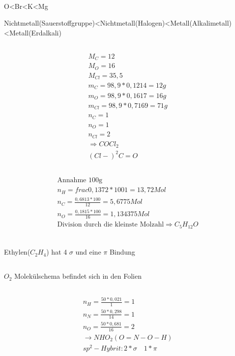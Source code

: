 \documentclass[a4paper]{article}
\begin{document}
\subsection{}
  O<Br<K<Mg

  Nichtmetall(Sauerstoffgruppe)<Nichtmetall(Halogen)<Metall(Alkalimetall)<Metall(Erdalkali)

\subsection{}
\begin{align}
  M_C=12 \\
  M_O=16\\
  M_{Cl}=35,5 \\
  m_C=98,9*0,1214=12g\\
  m_O=98,9*0,1617=16g\\
  m_{Cl}=98,9*0,7169=71g\\
  n_C=1\\
  n_O=1\\
  n_{Cl}=2\\
  \Rightarrow COCl_2\\
  (Cl-)^2C=O
\end{align}

\subsection{}
\begin{align}
  \text{Annahme 100g}\\
  n_H=frac{0,1372*100}{1}=13,72Mol\\
  n_C=\frac{0,6813*100}{12}=5,6775Mol\\
  n_O=\frac{0,1815*100}{16}=1,134375Mol\\
  \text{Division durch die kleinste Molzahl}
  \Rightarrow C_5H_{12}O\\
\end{align}

\subsection{}
  Ethylen($C_2H_4$) hat 4 $\sigma$ und eine $\pi$ Bindung

\subsection{}
  $O_2$ Molekülschema befindet sich in den Folien

\subsection{}
\begin{align}
  n_H=\frac{50*0,021}{1}=1\\
  n_N=\frac{50*0,298}{14}=1\\
  n_O=\frac{50*0,681}{16}=2\\
  \rightarrow NHO_2(O=N-O-H)\\
  sp^2-Hybrit:2*\sigma \quad 1*\pi
\end{align}
\end{document}
